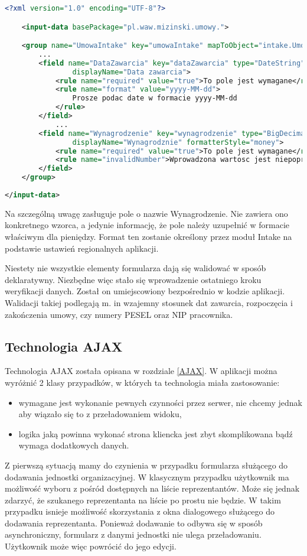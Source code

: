 \begin{lstlisting}[language=XML,style=outcode,showstringspaces=false,caption={Fragment konfiguracji modułu Intake zawierający reguły, jakie powinny spełniać pola formularza do wprowadzania umowy},label={intakeGroupFactory}]
<?xml version="1.0" encoding="UTF-8"?>

	<input-data basePackage="pl.waw.mizinski.umowy.">

	<group name="UmowaIntake" key="umowaIntake" mapToObject="intake.UmowaIntake">
		...
		<field name="DataZawarcia" key="dataZawarcia" type="DateString" 
				displayName="Data zawarcia">
			<rule name="required" value="true">To pole jest wymagane</rule>
			<rule name="format" value="yyyy-MM-dd">
				Prosze podac date w formacie yyyy-MM-dd
			</rule>
		</field>
			...
		<field name="Wynagrodzenie" key="wynagrodzenie" type="BigDecimal" 
				displayName="Wynagrodznie" formatterStyle="money">
			<rule name="required" value="true">To pole jest wymagane</rule>
			<rule name="invalidNumber">Wprowadzona wartosc jest niepoprawna</rule>
		</field>
	</group>
	
</input-data>
\end{lstlisting}

Na szczególną uwagę zasługuje pole o nazwie Wynagrodzenie. Nie zawiera ono konkretnego wzorca, a jedynie informację, że pole należy uzupełnić w formacie właściwym dla pieniędzy. Format ten zostanie określony przez moduł Intake na podstawie ustawień regionalnych aplikacji. 

Niestety nie wszystkie elementy formularza dają się walidować w sposób deklaratywny. Niezbędne więc stało się wprowadzenie ostatniego kroku weryfikacji danych. Został on umiejscowiony bezpośrednio w kodzie aplikacji. Walidacji takiej podlegają m. in wzajemny stosunek dat zawarcia, rozpoczęcia i zakończenia umowy, czy numery PESEL oraz NIP pracownika.

\subsection[Technologia AJAX][Technologia AJAX]{Technologia AJAX}
Technologia AJAX została opisana w rozdziale \ref{AJAX}. W aplikacji można wyróżnić 2 klasy przypadków, w których ta technologia miała zastosowanie:
\begin{itemize}
	\item wymagane jest wykonanie pewnych czynności przez serwer, nie chcemy jednak aby wiązało się to z przeładowaniem widoku,
	\item logika jaką powinna wykonać strona kliencka jest zbyt skomplikowana bądź wymaga dodatkowych danych.
\end{itemize}
Z pierwszą sytuacją mamy do czynienia w przypadku formularza służącego do dodawania jednostki organizacyjnej. W klasycznym przypadku użytkownik ma możliwość wyboru z pośród dostępnych na liście reprezentantów. Może się jednak zdarzyć, że szukanego reprezentanta na liście po prostu nie będzie. W takim przypadku isnieje możliwość skorzystania z okna dialogowego służącego do dodawania reprezentanta. Ponieważ dodawanie to odbywa się w sposób asynchroniczny, formularz z danymi jednostki nie ulega przeładowaniu. Użytkownik może więc powrócić do jego edycji.

